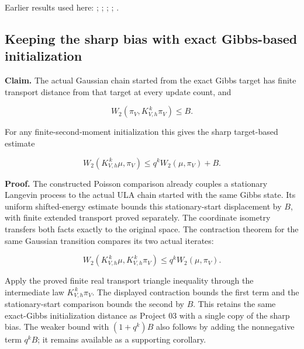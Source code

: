 \documentclass[11pt,a4paper]{report}
\begin{document}
Earlier results used here: \cite[Section~3.17.3]{LangevinLean2026ULASC}; \cite[Section~3.21.2]{LangevinLean2026ULASC}; \cite[Section~3.26.3]{LangevinLean2026ULASC}; \cite[Section~3.36.7]{LangevinLean2026ULASC}; \cite[Section~3.45.6]{LangevinLean2026ULASC}.
\subsection{\texorpdfstring{Keeping the sharp bias with exact Gibbs-based initialization}{Keeping the sharp bias with exact Gibbs-based initialization}}
\label{report-step-WassersteinMixing-IPLABridge-lean-4}


\textbf{Claim.} The actual Gaussian chain started from the exact Gibbs target has finite transport distance from that target at every update count, and

\[W_2(\pi_V,K_{V,h}^{\,k}\pi_V)\le B.\]


For any finite-second-moment initialization this gives the sharp target-based estimate

\[W_2(K_{V,h}^{\,k}\mu,\pi_V)\le q^kW_2(\mu,\pi_V)+B.\]


\textbf{Proof.} The constructed Poisson comparison already couples a stationary Langevin process to the actual ULA chain started with the same Gibbs state. Its uniform shifted-energy estimate bounds this stationary-start displacement by \(B\), with finite extended transport proved separately. The coordinate isometry transfers both facts exactly to the original space. The contraction theorem for the same Gaussian transition compares its two actual iterates:

\[W_2(K_{V,h}^{\,k}\mu,K_{V,h}^{\,k}\pi_V)\le q^kW_2(\mu,\pi_V).\]


Apply the proved finite real transport triangle inequality through the intermediate law \(K_{V,h}^{\,k}\pi_V\). The displayed contraction bounds the first term and the stationary-start comparison bounds the second by \(B\). This retains the same exact-Gibbs initialization distance as Project 03 with a single copy of the sharp bias. The weaker bound with \((1+q^k)B\) also follows by adding the nonnegative term \(q^kB\); it remains available as a supporting corollary.
\end{document}
